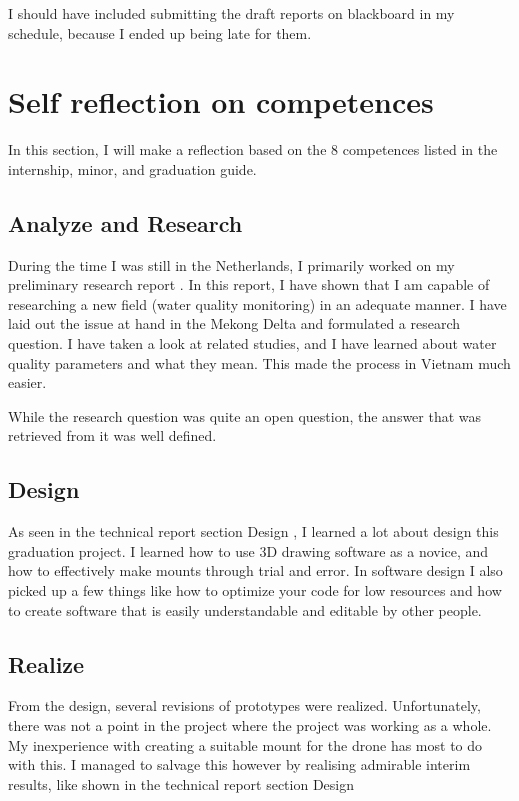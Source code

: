 \documentclass[11pt, a4paper]{article}
\begin{document}
I should have included submitting the draft reports on blackboard in my schedule, because I ended up being late for them.

\newpage
\section{Self reflection on competences}
In this section, I will make a reflection based on the 8 competences listed in the internship, minor, and graduation guide.


\subsection{Analyze and Research}
During the time I was still in the Netherlands, I primarily worked on my preliminary research report \cite{prr}. In this report, I have shown that I am capable of researching a new field (water quality monitoring) in an adequate manner. I have laid out the issue at hand in the Mekong Delta and formulated a research question. I have taken a look at related studies, and I have learned about water quality parameters and what they mean. This made the process in Vietnam much easier.

While the research question was quite an open question, the answer that was retrieved from it was well defined.

\subsection{Design}
As seen in the technical report section Design \cite{tr}, I learned a lot about design this graduation project. I learned how to use 3D drawing software\cite{fusion360} as a novice, and how to effectively make mounts through trial and error. In software design I also picked up a few things like how to optimize your code for low resources and how to create software that is easily understandable and editable by other people.

\subsection{Realize}
From the design, several revisions of prototypes were realized. Unfortunately, there was not a point in the project where the project was working as a whole. My inexperience with creating a suitable mount for the drone has most to do with this. I managed to salvage this however by realising admirable interim results, like shown in the technical report section Design \cite{tr}
\end{document}
